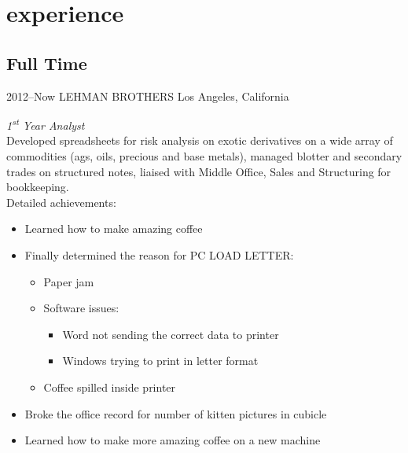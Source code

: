 \documentclass[]{friggeri-cv-a4}
\begin{document}

\section{experience}

\subsection{Full Time}

\begin{entrylist}


\entry
{2012--Now}
{LEHMAN BROTHERS}
{Los Angeles, California}
{\emph{1\textsuperscript{st} Year Analyst} \\
Developed spreadsheets for risk analysis on exotic derivatives on a wide array of commodities (ags, oils, precious and base metals), managed blotter and secondary trades on structured notes, liaised with Middle Office, Sales and Structuring for bookkeeping. \\
Detailed achievements:
\begin{itemize}
\item Learned how to make amazing coffee
\item Finally determined the reason for \textsc{PC LOAD LETTER}:
\begin{itemize}
\item Paper jam
\item Software issues:
\begin{itemize}
\item Word not sending the correct data to printer
\item Windows trying to print in letter format
\end{itemize}
\item Coffee spilled inside printer
\end{itemize}
\item Broke the office record for number of kitten pictures in cubicle
\item Learned how to make more amazing coffee on a new machine
\end{itemize}}


\end{entrylist}
\end{document}

